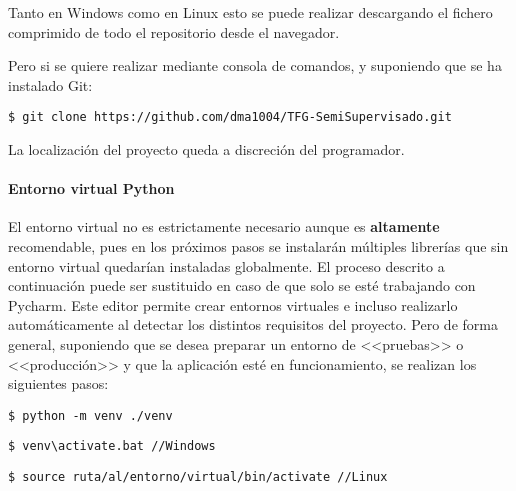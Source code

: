 Tanto en Windows como en Linux esto se puede realizar descargando el fichero
comprimido de todo el repositorio desde el navegador.

Pero si se quiere realizar mediante consola de comandos, y suponiendo que se ha
instalado Git:

\begin{tcolorbox}[colback=cyan!5!white,colframe=cyan!75!black,fontupper=\footnotesize,title=Clonación de repositorio desde consola]
\begin{verbatim}
$ git clone https://github.com/dma1004/TFG-SemiSupervisado.git
\end{verbatim}
\end{tcolorbox}
La localización del proyecto queda a discreción del programador.
\paragraph{Entorno virtual Python} El entorno virtual no es estrictamente
necesario aunque es \textbf{altamente} recomendable, pues en los próximos pasos
se instalarán múltiples librerías que sin entorno virtual quedarían instaladas
globalmente. El proceso descrito a continuación puede ser sustituido en caso de
que solo se esté trabajando con Pycharm. Este editor permite crear entornos
virtuales e incluso realizarlo automáticamente al detectar los distintos
requisitos del proyecto. Pero de forma general, suponiendo que se desea preparar
un entorno de <<pruebas>> o <<producción>> y que la aplicación esté en
funcionamiento, se realizan los siguientes pasos:
\begin{tcolorbox}[colback=cyan!5!white,colframe=orange!75!black,title=Creación del entorno virtual (dentro de la carpeta deseado)]
\begin{verbatim}
$ python -m venv ./venv
\end{verbatim}
\end{tcolorbox}

\begin{tcolorbox}[colback=cyan!5!white,colframe=cyan!75!black,fontupper=\footnotesize,fontlower=\footnotesize,title=Activación del entorno virtual]
\begin{verbatim}
$ venv\activate.bat //Windows
\end{verbatim}
\tcblower
\begin{verbatim}
$ source ruta/al/entorno/virtual/bin/activate //Linux
\end{verbatim}
\end{tcolorbox}

